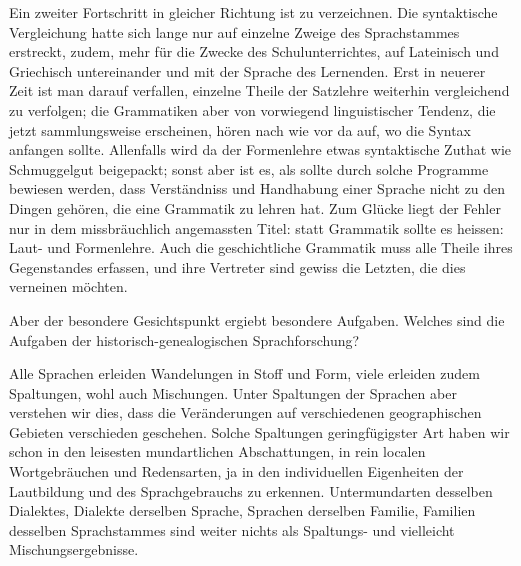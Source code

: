 Ein zweiter Fortschritt in gleicher Richtung ist zu verzeichnen. Die syntaktische Vergleichung hatte sich lange nur auf einzelne Zweige \label{fp.147} des Sprachstammes erstreckt, zudem, mehr für die Zwecke des Schulunterrichtes, auf Lateinisch und Griechisch untereinander und mit der Sprache des Lernenden. Erst in neuerer Zeit ist man darauf verfallen, einzelne Theile der Satzlehre weiterhin vergleichend zu verfolgen; die Grammatiken aber von vorwiegend linguistischer Tendenz, die jetzt sammlungsweise erscheinen, hören nach wie vor da auf, wo die Syntax anfangen sollte. Allenfalls wird da der Formenlehre etwas syntak\label{sp.138}tische Zuthat wie Schmuggelgut beigepackt; sonst aber ist es, als sollte durch solche Programme bewiesen werden, dass Verständniss und Handhabung einer Sprache nicht zu den Dingen gehören, die eine Grammatik zu lehren hat. Zum Glücke liegt der Fehler nur in dem missbräuchlich angemassten Titel: statt Grammatik sollte es heissen: Laut- und Formenlehre. Auch die geschichtliche Grammatik muss alle Theile ihres Gegenstandes erfassen, und ihre Vertreter sind gewiss die Letzten, die dies verneinen möchten.

Aber der besondere Gesichtspunkt ergiebt besondere Aufgaben. Welches sind die Aufgaben der historisch-genealogischen Sprachforschung?

Alle Sprachen erleiden Wandelungen in Stoff und Form, viele erleiden zudem Spaltungen, wohl auch Mischungen. Unter Spaltungen der Sprachen aber verstehen wir dies, dass die Veränderungen auf verschiedenen geographischen Gebieten verschieden geschehen. Solche Spaltungen geringfügigster Art haben wir schon in den leisesten mundartlichen Abschattungen, in rein localen Wortgebräuchen und Redensarten, ja in den individuellen Eigenheiten der Lautbildung und des Sprachgebrauchs zu erkennen. Untermundarten desselben Dialektes, Dialekte derselben Sprache, Sprachen derselben Familie, Familien desselben Sprachstammes sind weiter nichts als Spaltungs- und vielleicht Mischungsergebnisse.

